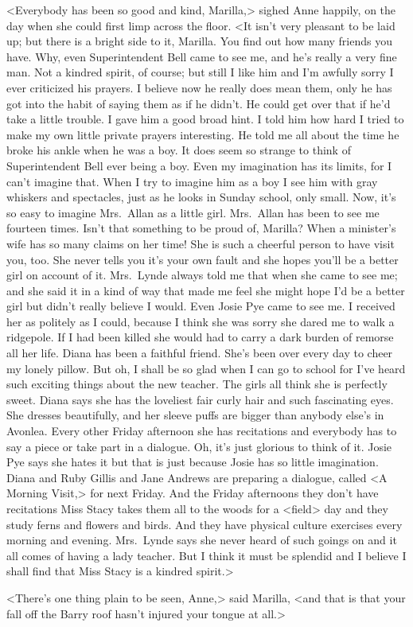 <Everybody has been so good and kind, Marilla,> sighed Anne happily, on the day when she could first limp across the floor. <It isn't very pleasant to be laid up; but there is a bright side to it, Marilla. You find out how many friends you have. Why, even Superintendent Bell came to see me, and he's really a very fine man. Not a kindred spirit, of course; but still I like him and I'm awfully sorry I ever criticized his prayers. I believe now he really does mean them, only he has got into the habit of saying them as if he didn't. He could get over that if he'd take a little trouble. I gave him a good broad hint. I told him how hard I tried to make my own little private prayers interesting. He told me all about the time he broke his ankle when he was a boy. It does seem so strange to think of Superintendent Bell ever being a boy. Even my imagination has its limits, for I can't imagine that. When I try to imagine him as a boy I see him with gray whiskers and spectacles, just as he looks in Sunday school, only small. Now, it's so easy to imagine Mrs.~Allan as a little girl. Mrs.~Allan has been to see me fourteen times. Isn't that something to be proud of, Marilla? When a minister's wife has so many claims on her time! She is such a cheerful person to have visit you, too. She never tells you it's your own fault and she hopes you'll be a better girl on account of it. Mrs.~Lynde always told me that when she came to see me; and she said it in a kind of way that made me feel she might hope I'd be a better girl but didn't really believe I would. Even Josie Pye came to see me. I received her as politely as I could, because I think she was sorry she dared me to walk a ridgepole. If I had been killed she would had to carry a dark burden of remorse all her life. Diana has been a faithful friend. She's been over every day to cheer my lonely pillow. But oh, I shall be so glad when I can go to school for I've heard such exciting things about the new teacher. The girls all think she is perfectly sweet. Diana says she has the loveliest fair curly hair and such fascinating eyes. She dresses beautifully, and her sleeve puffs are bigger than anybody else's in Avonlea. Every other Friday afternoon she has recitations and everybody has to say a piece or take part in a dialogue. Oh, it's just glorious to think of it. Josie Pye says she hates it but that is just because Josie has so little imagination. Diana and Ruby Gillis and Jane Andrews are preparing a dialogue, called <A Morning Visit,> for next Friday. And the Friday afternoons they don't have recitations Miss Stacy takes them all to the woods for a <field> day and they study ferns and flowers and birds. And they have physical culture exercises every morning and evening. Mrs.~Lynde says she never heard of such goings on and it all comes of having a lady teacher. But I think it must be splendid and I believe I shall find that Miss Stacy is a kindred spirit.>

<There's one thing plain to be seen, Anne,> said Marilla, <and that is that your fall off the Barry roof hasn't injured your tongue at all.>